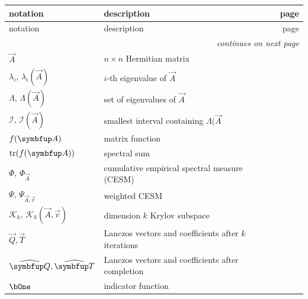 \begin{center}
    \begin{tabularx}{\textwidth}{p{1.9cm}Xr}\toprule
     notation & description & page \\\midrule\endfirsthead
    \toprule 
    notation & description & page \\\midrule\endhead
    \midrule\multicolumn{3}{r}{\itshape continues on next page}\\\midrule\endfoot
    \bottomrule\endlastfoot
        \( \vec{A} \) & \( n\times n \) Hermitian matrix & \pageref{eqn:A} \\
        \( \lambda_i \), \( \lambda_i(\vec{A}) \) & \( i \)-th eigenvalue of \( \vec{A} \) & \pageref{eqn:A} \\
        \( \Lambda \), \( \Lambda(\vec{A}) \) & set of eigenvalues of \( \vec{A} \) & \pageref{eqn:A} \\
        \( \mathcal{I} \), \( \mathcal{I}(\vec{A}) \) & smallest interval containing \( \Lambda(\vec{A} \) & \pageref{eqn:unif_bound} \\
    \midrule
    \( \fA \) & matrix function & \pageref{def:fA} \\
    \( \tr(\fA) \) & spectral sum & \pageref{eqn:spectral_sum} \\
        \( \Phi \), \(\Phi_{\vec{A}} \) & cumulative empirical spectral measure (CESM) & \pageref{def:CESM} \\
        \( \Psi \), \( \Psi_{\vec{A},\vec{v}} \) & weighted CESM & \pageref{def:wCESM} \\
        \( \mathcal{K}_k \), \( \mathcal{K}_k(\vec{A},\vec{v}) \) & dimension \( k \) Krylov subspace & \pageref{def:Kk} \\
    \( \vec{Q},\vec{T} \) & Lanczos vectors and coefficients after \( k \) iterations & \pageref{eqn:lanczos_three_term} \\
        \( \Qhat,\widehat{\vec{T}} \) & Lanczos vectors and coefficients after completion & \pageref{eqn:lanczos_three_term_complete} \\
    \midrule
        \( \bOne \) & indicator function & \pageref{eqn:A} \\

\end{tabularx}
\end{center}
